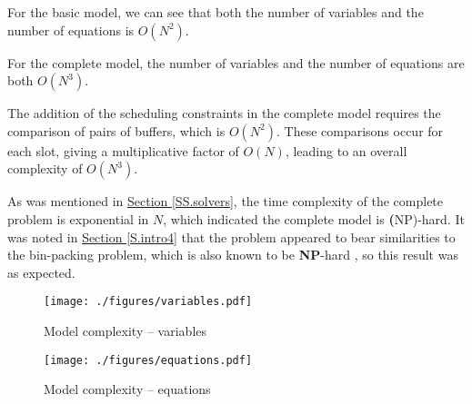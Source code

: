 For the basic model, we can see that both the number of variables and the
number of equations is $O \left( N^2 \right)$.

For the complete model, the number of variables and the number of equations
are both $O \left( N^3 \right)$.

The addition of the scheduling constraints in the complete model requires the
comparison of pairs of buffers, which is $O \left( N^2 \right)$. 
These comparisons occur for each slot, giving a multiplicative factor of 
$O \left( N \right)$, leading to an overall complexity of
$O \left( N^3 \right)$.

As was mentioned in \hyperref[SS.solvers]{Section \ref*{SS.solvers}}, the time
complexity of the complete problem is exponential in $N$, which indicated the
complete model is \textbf(NP)-hard.
It was noted in \hyperref[S.intro4]{Section \ref*{S.intro4}}
that the problem appeared to bear similarities to the
bin-packing problem, which is also known to be \textbf{NP}-hard
\citep{Korte:2012}, so this result was as expected.


\begin{figure}
    \centering
    \texttt{[image: ./figures/variables.pdf]}
    \caption{Model complexity -- variables}
    \label{fig.dims}
\end{figure}
\begin{figure}
    \centering
    \texttt{[image: ./figures/equations.pdf]}
    \caption{Model complexity -- equations}
    \label{fig.eqns}
\end{figure}
